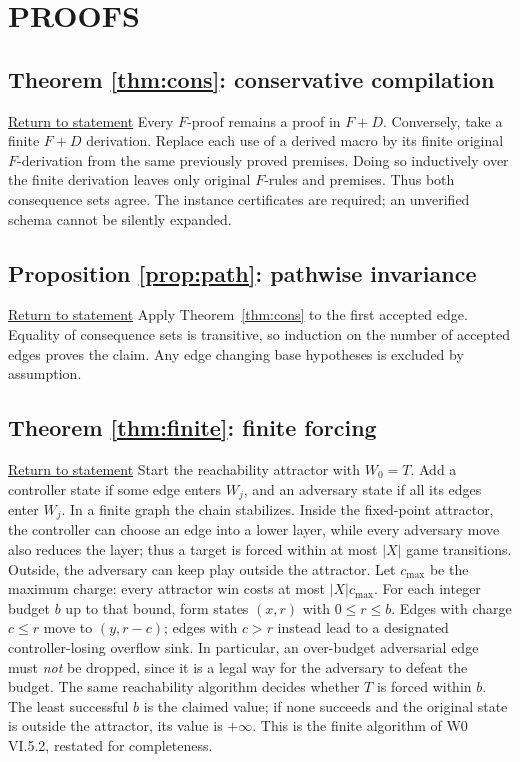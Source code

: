 \documentclass[11pt,letterpaper]{article}
\theoremstyle{definition}
\theoremstyle{remark}
\newcommand{\backstatement}[1]{\hyperlink{stmt:#1}{\footnotesize Return to statement}}
\begin{document}
\section{PROOFS}
\hypertarget{proof:cons}{}\subsection*{Theorem \ref{thm:cons}: conservative compilation} \backstatement{cons}
Every $F$-proof remains a proof in $F+D$. Conversely, take a finite $F+D$ derivation. Replace each use of a derived macro by its finite original $F$-derivation from the same previously proved premises. Doing so inductively over the finite derivation leaves only original $F$-rules and premises. Thus both consequence sets agree. The instance certificates are required; an unverified schema cannot be silently expanded.

\hypertarget{proof:path}{}\subsection*{Proposition \ref{prop:path}: pathwise invariance} \backstatement{path}
Apply Theorem~\ref{thm:cons} to the first accepted edge. Equality of consequence sets is transitive, so induction on the number of accepted edges proves the claim. Any edge changing base hypotheses is excluded by assumption.

\hypertarget{proof:finite}{}\subsection*{Theorem \ref{thm:finite}: finite forcing} \backstatement{finite}
Start the reachability attractor with $W_0=T$. Add a controller state if some edge enters $W_j$, and an adversary state if all its edges enter $W_j$. In a finite graph the chain stabilizes. Inside the fixed-point attractor, the controller can choose an edge into a lower layer, while every adversary move also reduces the layer; thus a target is forced within at most $|X|$ game transitions. Outside, the adversary can keep play outside the attractor. Let $c_{\max}$ be the maximum charge: every attractor win costs at most $|X|c_{\max}$. For each integer budget $b$ up to that bound, form states $(x,r)$ with $0\le r\le b$. Edges with charge $c\le r$ move to $(y,r-c)$; edges with $c>r$ instead lead to a designated controller-losing overflow sink. In particular, an over-budget adversarial edge must \emph{not} be dropped, since it is a legal way for the adversary to defeat the budget. The same reachability algorithm decides whether $T$ is forced within $b$. The least successful $b$ is the claimed value; if none succeeds and the original state is outside the attractor, its value is $+\infty$. This is the finite algorithm of W0 VI.5.2, restated for completeness.
\end{document}
